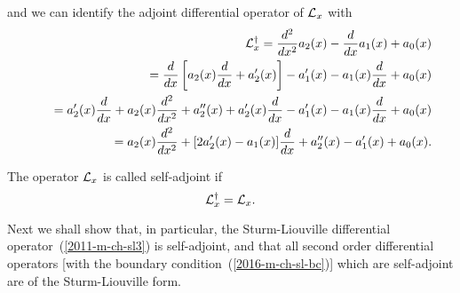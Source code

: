 and we can identify the adjoint differential operator of ${\cal L}_x$ with
\begin{equation}
\begin{split}
{\cal L}_x^\dagger
=\frac{d^2}{dx^2}  a_2(x)  - \frac{d }{dx } a_1(x)    + a_0(x) \\
\qquad =
\frac{d}{dx} \left[ a_2(x) \frac{d}{dx} + a'_2(x)\right]  - a'_1(x) - a_1(x)\frac{d }{dx }    + a_0(x) \\
\qquad =
 a'_2(x) \frac{d}{dx} + a_2(x) \frac{d^2}{dx^2} + a''_2(x) + a'_2(x)\frac{d}{dx}
  - a'_1(x) - a_1(x)\frac{d }{dx }    + a_0(x)  \\
\qquad =
 a_2(x) \frac{d^2}{dx^2}
+
[2 a'_2(x)- a_1(x) ]  \frac{d}{dx}
+ a''_2(x)   - a'_1(x)   + a_0(x)
.
\end{split}
\label{2011-m-ch-slspbtfaob}
\end{equation}

The operator ${\cal L}_x$ is called self-adjoint if
\begin{equation}
{\cal L}_x^\dagger
=  {\cal L}_x .
\label{2011-m-ch-slspbtfaob1}
\end{equation}

Next we shall show that, in particular, the Sturm-Liouville differential operator~(\ref{2011-m-ch-sl3}) is self-adjoint,
and that all second order differential operators [with the boundary condition~(\ref{2016-m-ch-sl-bc})] which are  self-adjoint
are of the Sturm-Liouville form.

